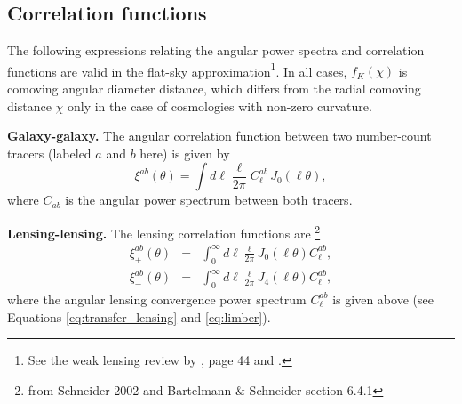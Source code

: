 \documentclass[\docopts]{\docclass}
\newcommand{\mrm}[1]{\mathrm{#1}}
\begin{document}

%
%

\subsection{Correlation functions}
\label{sec:corr}


The following expressions relating the angular power spectra and correlation functions are valid in the flat-sky approximation\footnote{See the weak lensing review by \citet{Bartelmann01}, page 44 and \citet{Joachimi10}.}. In all cases, $f_K(\chi)$ is comoving angular diameter distance, which differs from the radial comoving distance $\chi$ only in the case of cosmologies with non-zero curvature.

{\bf Galaxy-galaxy.} The angular correlation function between two number-count tracers (labeled $a$ and $b$ here) is given by
\begin{equation}
  \xi^{ab}(\theta) = \int d\ell \frac{\ell}{2\pi} C^{ab}_\ell\, J_0(\ell\theta),
\label{eq:xiclu}
\end{equation}
where $C_{ab}$ is the angular power spectrum between both tracers.

{\bf Lensing-lensing.} The lensing correlation functions are \footnote{from Schneider 2002 and Bartelmann \& Schneider section 6.4.1}
\begin{eqnarray}
  \xi^{ab}_{+}(\theta)&=&\int_0^{\infty}d\ell\frac{\ell}{2\pi}J_0(\ell\theta)C^{ab}_\ell,\\
  \xi^{ab}_{-}(\theta)&=&\int_0^{\infty}d\ell\frac{\ell}{2\pi}J_4(\ell\theta)C^{ab}_\ell,
\label{eq:xipxim}
\end{eqnarray}
where the angular lensing convergence power spectrum $C^{ab}_\ell$ is given above (see Equations \ref{eq:transfer_lensing} and \ref{eq:limber}).
\end{document}
